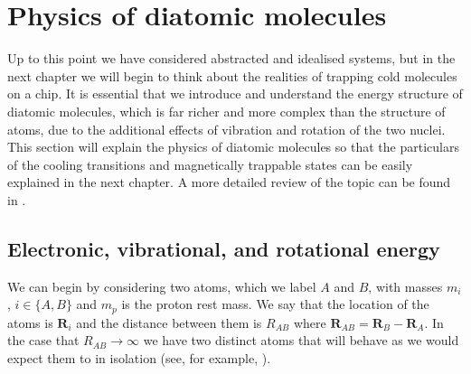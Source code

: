 \section{Physics of diatomic molecules}
\label{theory:molecules}

Up to this point we have considered abstracted and idealised systems, but in
the next chapter we will begin to think about the realities of trapping cold
molecules on a chip. It is essential that we introduce and understand the
energy structure of diatomic molecules, which is far richer and more complex
than the structure of atoms, due to the additional effects of vibration and
rotation of the two nuclei. This section will explain the physics of diatomic
molecules so that the particulars of the cooling transitions and magnetically
trappable states can be easily explained in the next chapter. A more
detailed review of the topic can be found in .

\subsection{Electronic, vibrational, and rotational energy}

We can begin by considering two atoms, which we label $A$ and $B$,
with masses  $m_i$, $i\in\{A,B\}$ and $m_p$ is the proton rest mass. We say that the location of the
atoms is $\mathbf{R}_i$ and the distance between them is
$R_{AB}$ where $\mathbf{R}_{AB} = \mathbf{R}_B - \mathbf{R}_A$. In the case
that $R_{AB} \rightarrow \infty$ we have two distinct atoms that will behave 
as we would expect them to in isolation (see, for example,
).

